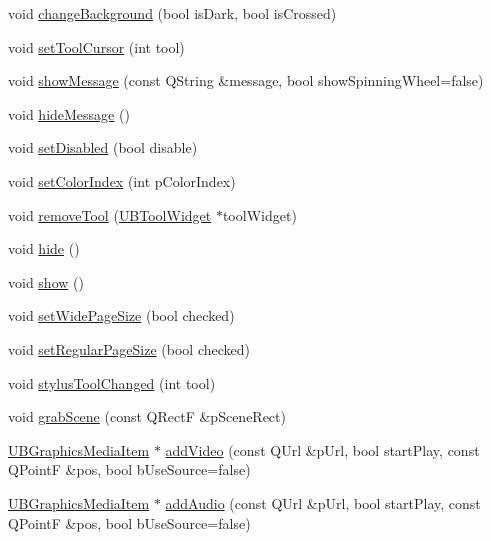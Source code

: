 \begin{DoxyCompactItemize}
\item 
void \hyperlink{class_u_b_board_controller_a32c4b12cb671b357e546002060065356}{change\-Background} (bool is\-Dark, bool is\-Crossed)
\item 
void \hyperlink{class_u_b_board_controller_ad363554dfb70642a295c4b002f396ec5}{set\-Tool\-Cursor} (int tool)
\item 
void \hyperlink{class_u_b_board_controller_a71ff510e4ce1e3a753f074a0e7438a00}{show\-Message} (const Q\-String \&message, bool show\-Spinning\-Wheel=false)
\item 
void \hyperlink{class_u_b_board_controller_a71d2fb8834fc701bed0b16bb0f0b5527}{hide\-Message} ()
\item 
void \hyperlink{class_u_b_board_controller_af6251367977a32a2b20beac0a63a711f}{set\-Disabled} (bool disable)
\item 
void \hyperlink{class_u_b_board_controller_a7d9d265f0f98e913898c06bf897dbf2f}{set\-Color\-Index} (int p\-Color\-Index)
\item 
void \hyperlink{class_u_b_board_controller_ad6d191224e83ac7c1d9b1631824a185b}{remove\-Tool} (\hyperlink{class_u_b_tool_widget}{U\-B\-Tool\-Widget} $\ast$tool\-Widget)
\item 
void \hyperlink{class_u_b_board_controller_a67d3bac6634fcd9f78e664d9fc67318a}{hide} ()
\item 
void \hyperlink{class_u_b_board_controller_a4d5e22da0b52e04622837b0c1280e67b}{show} ()
\item 
void \hyperlink{class_u_b_board_controller_a8ba21cf9f9bcd0680e90a67964bc75f2}{set\-Wide\-Page\-Size} (bool checked)
\item 
void \hyperlink{class_u_b_board_controller_a47026c255a9a91ca35a0c0f92872c41b}{set\-Regular\-Page\-Size} (bool checked)
\item 
void \hyperlink{class_u_b_board_controller_ab46e478b8096354cf99816a1565a3b8e}{stylus\-Tool\-Changed} (int tool)
\item 
void \hyperlink{class_u_b_board_controller_a497f046a815b6a08d8c791f574836593}{grab\-Scene} (const Q\-Rect\-F \&p\-Scene\-Rect)
\item 
\hyperlink{class_u_b_graphics_media_item}{U\-B\-Graphics\-Media\-Item} $\ast$ \hyperlink{class_u_b_board_controller_a8716b740e0b6759dfc26f0b1f07789eb}{add\-Video} (const Q\-Url \&p\-Url, bool start\-Play, const Q\-Point\-F \&pos, bool b\-Use\-Source=false)
\item 
\hyperlink{class_u_b_graphics_media_item}{U\-B\-Graphics\-Media\-Item} $\ast$ \hyperlink{class_u_b_board_controller_a7e127684a3dcbc3f28e232747f78304d}{add\-Audio} (const Q\-Url \&p\-Url, bool start\-Play, const Q\-Point\-F \&pos, bool b\-Use\-Source=false)

\end{DoxyCompactItemize}
